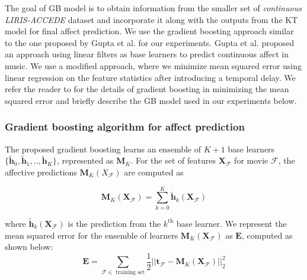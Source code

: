 \documentclass{article}
\begin{document}

The goal of GB model is to obtain information from the smaller set of {\it continuous LIRIS-ACCEDE} dataset and incorporate it along with the outputs from the KT model for final affect prediction.
We use the gradient boosting approach similar to the one proposed by Gupta et al. \cite{gupta2015affect} for our experiments.
Gupta et al. \cite{gupta2015affect} proposed an approach using linear filters as base learners to predict continuous affect in music. 
We use a modified approach, where we minimize mean squared error using linear regression on the feature statistics after introducing a temporal delay.
We refer the reader to \cite{friedman2001greedy,gupta2015affect} for the details of gradient boosting in minimizing the mean squared error and briefly describe the GB model used in our experiments below. 

\subsubsection{Gradient boosting algorithm for affect prediction}
The proposed gradient boosting learns an ensemble of $K+1$ base learners $\{\tilde{\bm h}_0, \tilde{\bm h}_1, .., \tilde{\bm h}_K\}$, represented as $\bm M_K$. 
For the set of features ${\bm X}_{\mathcal F}$ for movie $\mathcal F$, the affective predictions $\bm M_K(X_{\mathcal F})$ are computed as  

\begin{equation}
\bm M_K(\bm X_{\mathcal F}) = \sum_{k=0}^K \tilde{\bm h}_k(\bm X_\mathcal F)
\end{equation}

where $\tilde{\bm h}_k(\bm X_\mathcal F)$ is the prediction from the $k^\text{th}$ base learner.
We represent the mean squared error for the ensemble of learners $\bm M_K(\bm X_\mathcal F)$ as $\bm E$, computed as shown below: 
\begin{equation}
\bm E = \sum_\text{$\mathcal F \in$ training set} \frac{1}{2}||\bm t_\mathcal F - \bm M_K(\bm X_\mathcal F)||_2^2 
\end{equation}
\end{document}
